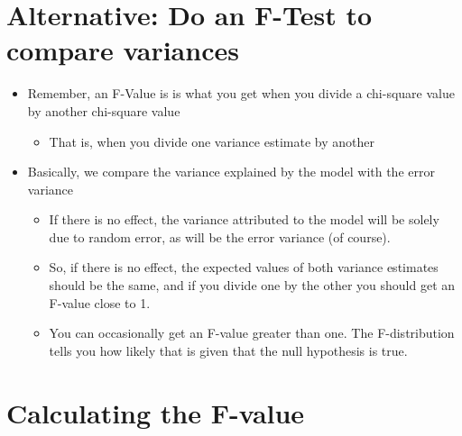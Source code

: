 \documentclass[]{article}
\providecommand{\tightlist}{%
  \setlength{\itemsep}{0pt}\setlength{\parskip}{0pt}}
\begin{document}
\section{Alternative: Do an F-Test to compare
variances}\label{alternative-do-an-f-test-to-compare-variances}

\begin{itemize}
\tightlist
\item
  Remember, an F-Value is is what you get when you divide a chi-square
  value by another chi-square value

  \begin{itemize}
  \tightlist
  \item
    That is, when you divide one variance estimate by another
  \end{itemize}
\item
  Basically, we compare the variance explained by the model with the
  error variance

  \begin{itemize}
  \tightlist
  \item
    If there is no effect, the variance attributed to the model will be
    solely due to random error, as will be the error variance (of
    course).
  \item
    So, if there is no effect, the expected values of both variance
    estimates should be the same, and if you divide one by the other you
    should get an F-value close to 1.
  \item
    You can occasionally get an F-value greater than one. The
    F-distribution tells you how likely that is given that the null
    hypothesis is true.
  \end{itemize}
\end{itemize}

\section{Calculating the F-value}\label{calculating-the-f-value}
\end{document}
